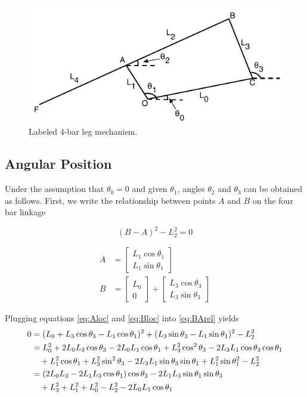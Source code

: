 \documentclass[letterpaper]{article}
\begin{document}
\begin{figure}[htb]
	\centering
	\includegraphics{4bar.pdf}
	\caption{Labeled 4-bar leg mechanism.}
	\label{fig:4bar}
\end{figure}

\subsection{Angular Position}
Under the assumption that $\theta_0 = 0$ and given $\theta_1$, angles $\theta_2$ and $\theta_3$ can be obtained as follows. First, we write the relationship between points $A$ and $B$ on the four bar linkage

\begin{equation}
	(B - A)^2 - L_2^2 = 0
	\label{eq:BArel}
\end{equation}

\begin{align}
	A &= \begin{bmatrix} L_1 \cos \theta_1 \\ L_1 \sin \theta_1 \end{bmatrix} \label{eq:Aloc}\\
	B &= \begin{bmatrix} L_0 \\ 0 \end{bmatrix} + \begin{bmatrix} L_3 \cos \theta_3 \\ L_3 \sin \theta_3 \end{bmatrix} \label{eq:Bloc}
\end{align}

\noindent Plugging equations \ref{eq:Aloc} and \ref{eq:Bloc} into \ref{eq:BArel} yields
\begin{align}
	0 &= (L_0 + L_3 \cos \theta_3 - L_1 \cos \theta_1)^2 + (L_3 \sin \theta_3 - L_1 \sin \theta_1)^2 - L_2^2 \notag \\
	  &= L_0^2 + 2 L_0 L_3 \cos \theta_3 - 2 L_0 L_1 \cos \theta_1 + L_3^2 \cos^2 \theta_3 - 2 L_3 L_1 \cos \theta_3 \cos \theta_1 \notag \\
	  & \quad + L_1^2 \cos \theta_1 + L_3^2 \sin^2 \theta_3 - 2 L_3 L_1 \sin \theta_3 \sin \theta_1 + L_1^2 \sin \theta_1^2 - L_2^2 \notag \\
	  &= (2 L_0 L_3 - 2 L_1 L_3 \cos \theta_1) \cos \theta_3 - 2 L_1 L_3 \sin \theta_1 \sin \theta_3 \notag\\
	  & \quad + L_3^2 + L_1^2 + L_0^2 - L_2^2 - 2L_0 L_1 \cos \theta_1
\end{align}
\end{document}
